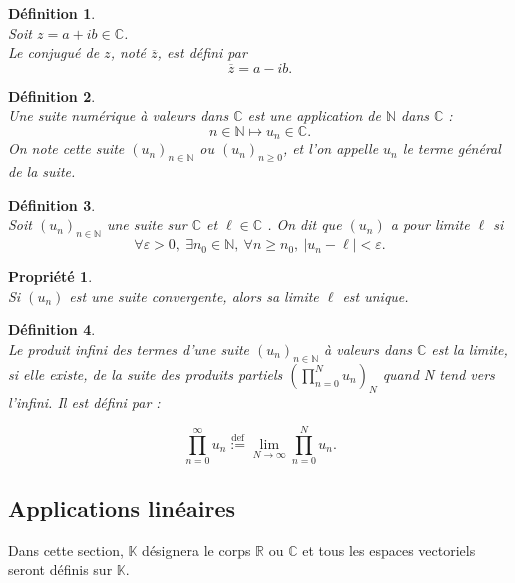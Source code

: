 \documentclass[a4paper, 14pt]{report}
\newtheorem{definition}{Définition}[section]
\newtheorem{propriety}{Propriété}[section]
\begin{document}
\begin{onehalfspace}
{\begin{definition} \cite{rudin1976principles} \\
Soit \( z = a + ib \in \mathbb{C} \).\\
Le conjugué de \( z \), noté \( \overline{z} \), est défini par
	\[
	\overline{z} = a - ib.
	\]
\end{definition}

\begin{definition}\cite{chatterji1997cours} \\
Une suite numérique à valeurs dans $\mathbb{C}$ est une application de $\mathbb{N}$ dans $\mathbb{C}$ :
	\[
	n \in \mathbb{N} \longmapsto u_n \in \mathbb{C}.
	\]
On note cette suite $(u_n)_{n \in \mathbb{N}}$ ou $(u_n)_{n \geq 0}$, et l'on appelle $u_n$ le terme général de la suite.
\end{definition}


\begin{definition} \cite{chatterji1997cours}\\
Soit $(u_n)_{n \in \mathbb{N}}$ une suite sur $\mathbb{C}$ et $\ell \in \mathbb{C}$ . On dit que $(u_n)$ a pour limite $\ell$ si
\[
\forall \varepsilon > 0 ,\ \exists n_0 \in \mathbb{N} ,\ \forall n \geq n_0,\ |u_n - \ell| < \varepsilon.
\]
\end{definition}

\begin{propriety} \cite{chatterji1997cours}\\
Si $(u_n)$ est une suite convergente, alors sa limite $\ell$ est unique.
\end{propriety}


\begin{definition} \cite{chatterji1997cours}\\
Le produit infini des termes d'une suite \( (u_n)_{n \in \mathbb{N}} \) à valeurs dans $\mathbb{C}$ est la limite, si elle existe, de la suite des produits partiels 
	\( \left( \prod_{n=0}^{N} u_n \right)_N \) quand N tend vers l'infini. Il est défini par :
	
	\[
	\prod_{n=0}^{\infty} u_n \overset{\text{def}}{:=} \lim_{N \to \infty} \prod_{n=0}^{N} u_n.
	\]
\end{definition}





\subsection{Applications linéaires}
Dans cette section, $\mathbb{K}$ désignera le corps $\mathbb{R}$ ou $\mathbb{C}$ et tous les espaces vectoriels seront définis sur $\mathbb{K}$.

}
\end{onehalfspace}
\end{document}
